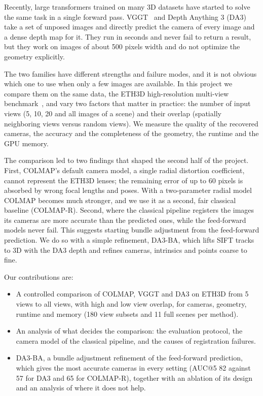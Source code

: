 \documentclass[10pt,twocolumn,letterpaper]{article}
\begin{document}
Recently, large transformers trained on many 3D datasets have started to solve the same task in a single
forward pass. VGGT~\cite{wang2025vggt} and Depth Anything 3 (DA3)~\cite{lin2025da3} take a set of unposed
images and directly predict the camera of every image and a dense depth map for it. They run in seconds and
never fail to return a result, but they work on images of about 500 pixels width and do not optimize the
geometry explicitly.

The two families have different strengths and failure modes, and it is not obvious which one to use when
only a few images are available. In this project we compare them on the same data, the ETH3D high-resolution
multi-view benchmark~\cite{schops2017eth3d}, and vary two factors that matter in practice: the number of
input views (5, 10, 20 and all images of a scene) and their overlap (spatially neighboring views versus random
views). We measure the quality of the recovered cameras, the accuracy and the completeness of the geometry, the
runtime and the GPU memory.

The comparison led to two findings that shaped the second half of the project. First, COLMAP's default camera
model, a single radial distortion coefficient, cannot represent the ETH3D lenses; the remaining error of up to
60 pixels is absorbed by wrong focal lengths and poses. With a two-parameter radial model COLMAP becomes much
stronger, and we use it as a second, fair classical baseline (COLMAP-R). Second, where the classical pipeline
registers the images its cameras are more accurate than the predicted ones, while the feed-forward models
never fail. This suggests starting bundle adjustment from the feed-forward prediction. We do so with a
simple refinement, DA3-BA, which lifts SIFT tracks to 3D with the DA3 depth and refines cameras, intrinsics
and points coarse to fine.

Our contributions are:
\begin{itemize}
\setlength\itemsep{0pt}
\item A controlled comparison of COLMAP, VGGT and DA3 on ETH3D from 5 views to all views, with high and low
view overlap, for cameras, geometry, runtime and memory (180 view subsets and 11 full scenes per method).
\item An analysis of what decides the comparison: the evaluation protocol, the camera model of the classical
pipeline, and the causes of registration failures.
\item DA3-BA, a bundle adjustment refinement of the feed-forward prediction, which gives the most accurate
cameras in every setting (AUC@5 82 against 57 for DA3 and 65 for COLMAP-R), together with an ablation of its
design and an analysis of where it does not help.
\end{itemize}
\end{document}
